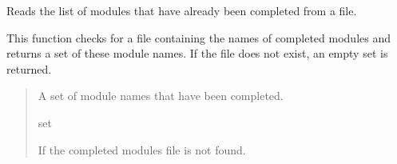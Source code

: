 \documentclass[letterpaper,10pt,english]{sphinxmanual}
\begin{document}

\begin{fulllineitems}
\label{\detokenize{modules.data_storage:modules.data_storage.main.read_completed_modules}}
\pysigstartsignatures
\pysiglinewithargsret
{}
{}
{}
\pysigstopsignatures
\sphinxAtStartPar
Reads the list of modules that have already been completed from a file.

\sphinxAtStartPar
This function checks for a file containing the names of completed modules and returns
a set of these module names. If the file does not exist, an empty set is returned.
\begin{quote}\begin{description}
\sphinxAtStartPar
A set of module names that have been completed.

\sphinxAtStartPar
set

\sphinxAtStartPar
{} \textendash{} If the completed modules file is not found.

\end{description}\end{quote}

\end{fulllineitems}

\end{document}
